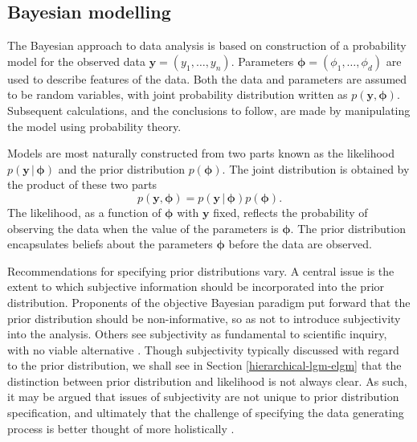 \documentclass[a4paper, nobind]{templates/ociamthesis}
\begin{document}
\hypertarget{bayesian-modelling}{%
\subsection{Bayesian modelling}\label{bayesian-modelling}}

The Bayesian approach to data analysis is based on construction of a probability model for the observed data \(\mathbf{y} = (y_1, \ldots, y_n)\).
Parameters \(\boldsymbol{\mathbf{\phi}} = (\phi_1, \ldots, \phi_d)\) are used to describe features of the data.
Both the data and parameters are assumed to be random variables, with joint probability distribution written as \(p(\mathbf{y}, \boldsymbol{\mathbf{\phi}})\).
Subsequent calculations, and the conclusions to follow, are made by manipulating the model using probability theory.

Models are most naturally constructed from two parts known as the likelihood \(p(\mathbf{y} \, | \, \boldsymbol{\mathbf{\phi}})\) and the prior distribution \(p(\boldsymbol{\mathbf{\phi}})\).
The joint distribution is obtained by the product of these two parts
\begin{equation}
p(\mathbf{y}, \boldsymbol{\mathbf{\phi}}) = p(\mathbf{y} \, | \, \boldsymbol{\mathbf{\phi}}) p(\boldsymbol{\mathbf{\phi}}). \label{eq:joint}
\end{equation}
The likelihood, as a function of \(\boldsymbol{\mathbf{\phi}}\) with \(\mathbf{y}\) fixed, reflects the probability of observing the data when the value of the parameters is \(\boldsymbol{\mathbf{\phi}}\).
The prior distribution encapsulates beliefs about the parameters \(\boldsymbol{\mathbf{\phi}}\) before the data are observed.

Recommendations for specifying prior distributions vary.
A central issue is the extent to which subjective information should be incorporated into the prior distribution.
Proponents of the objective Bayesian paradigm \autocite{berger2006case} put forward that the prior distribution should be non-informative, so as not to introduce subjectivity into the analysis.
Others see subjectivity as fundamental to scientific inquiry, with no viable alternative \autocite{goldstein2006subjective}.
Though subjectivity typically discussed with regard to the prior distribution, we shall see in Section \ref{hierarchical-lgm-elgm} that the distinction between prior distribution and likelihood is not always clear.
As such, it may be argued that issues of subjectivity are not unique to prior distribution specification, and ultimately that the challenge of specifying the data generating process is better thought of more holistically \autocite{gelman2017prior}.
\end{document}
